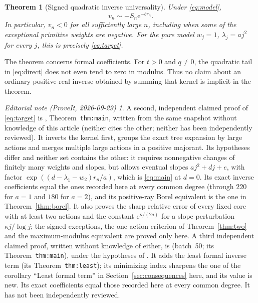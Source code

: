 \documentclass[11pt,a4paper]{article}
\numberwithin{equation}{section}
\newtheorem{theorem}{Theorem}[section]
\theoremstyle{definition}
\theoremstyle{remark}\newtheorem{remark}[theorem]{Remark}
\newtheorem*{ednote}{Editorial note (ProveIt, 2026-09-29)}
\newcommand{\ee}{\mathrm e}\newcommand{\dd}{\mathrm d}
\begin{document}
\begin{theorem}[Signed quadratic inverse universality]
\label{thm:main}
Under \eqref{eq:model},
\begin{equation}
 \boxed{\displaystyle v_n\sim-S_n\ee^{-br_n}.}
 \label{eq:main}
\end{equation}
In particular, $v_n<0$ for all sufficiently large $n$, including when some
of the exceptional primitive weights are negative.
For the pure model $w_j=1$, $\lambda_j=aj^2$ for every $j$,
this is precisely \eqref{eq:target}.
\end{theorem}

The theorem concerns formal coefficients. For $t>0$ and $q\ne0$, the
quadratic tail in \eqref{eq:direct} does not even tend to zero in modulus.
Thus no claim about an ordinary positive-real inverse obtained by summing
that kernel is implicit in the theorem.

\begin{ednote}
A second, independent claimed proof of \eqref{eq:target} is
\cite{ed:qef}, Theorem~\texttt{thm:main}, written from the same snapshot
without knowledge of this article (neither cites the other; neither has
been independently reviewed). It inverts the kernel first, groups the
exact tree expansion by large actions and merges multiple large actions in
a positive majorant. Its hypotheses differ and neither set contains the
other: it requires nonnegative changes of finitely many weights and
slopes, but allows eventual slopes $aj^2+dj+e$, with factor
$\exp((d-\lambda_1-w_2)r_n/a)$, which is \eqref{eq:main} at $d=0$. Its
exact inverse coefficients equal the ones recorded here at every common
degree (through $220$ for $a=1$ and $180$ for $a=2$), and its positive-ray
Borel equivalent is the one in Theorem~\ref{thm:borel}. It also proves the
sharp relative error of every fixed core with at least two actions and
the constant $\ee^{\kappa/(2a)}$ for a slope perturbation
$\kappa j/\log j$; the signed exceptions, the one-action criterion of
Theorem~\ref{thm:two} and the maximum-modulus equivalent are proved only
here.
A third independent claimed proof, written without knowledge of either, is
 (batch~50; its
Theorem~\texttt{thm:main}), under the hypotheses of \cite{ed:qef}. It adds
the least formal inverse term (its Theorem~\texttt{thm:least}); its
minimizing index sharpens the one of the corollary ``Least formal term'' in
Section~\ref{sec:consequences} here, and its value is new. Its exact coefficients equal those recorded here at every
common degree. It has not been independently reviewed.
\end{ednote}
\end{document}
